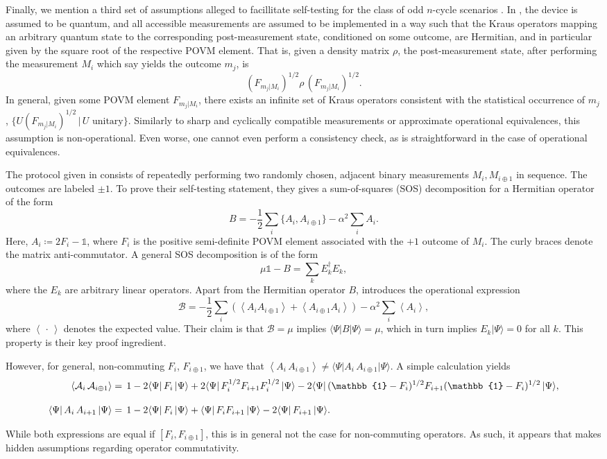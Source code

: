 Finally, we mention a third set of assumptions alleged to facillitate self-testing for the class of odd $n$-cycle scenarios \cite{Saha2020}. In \cite{Saha2020}, the device is assumed to be quantum, and all accessible measurements are assumed to be implemented in a way such that the Kraus operators mapping an arbitrary quantum state to the corresponding post-measurement state, conditioned on some outcome, are Hermitian, and in particular given by the square root of the respective POVM element. That is, given a density matrix $\rho$, the post-measurement state, after performing the measurement $M_i$ which say yields the outcome $m_j$, is 
\[(F_{m_j\vert M_i})^{1/2}\rho \,(F_{m_j\vert M_i})^{1/2}.\]
In general, given some POVM element $F_{m_j\vert M_i}$, there exists an infinite set of Kraus operators consistent with the statistical occurrence of $m_j$, $\{U(F_{m_j\vert M_i})^{1/2}\,\vert\, U \text{ unitary}\}$. Similarly to sharp and cyclically compatible measurements or approximate operational equivalences, this assumption is non-operational. Even worse, one cannot even perform a consistency check, as is straightforward in the case of operational equivalences.

The protocol given in \cite{Saha2020} consists of repeatedly performing two randomly chosen, adjacent binary measurements $M_i, M_{i\oplus 1}$ in sequence. The outcomes are labeled $\pm 1$.
To prove their self-testing statement, they gives a sum-of-squares (SOS) decomposition for a Hermitian operator of the form
\[B=-\frac{1}{2} \sum_i \{A_i, A_{i\oplus 1}\}-\alpha^2 \sum_i A_i.\] 
Here, $A_i \coloneqq 2F_i-\mathbb{1}$, where $F_i$ is the positive semi-definite POVM element associated with the $+1$ outcome of $M_i$. The curly braces denote the matrix anti-commutator.  A general SOS decomposition is of the form \[\mu\mathbb{1} - B = \sum_k E_k^{\dag}E_k,\]
where the $E_k$ are arbitrary linear operators. Apart from the Hermitian operator $B$, \cite{Saha2020} introduces the operational expression
\[\mathcal{B}=-\frac{1}{2}\sum_i \left(\left<A_i A_{i\oplus 1}\right> + \left<A_{i\oplus 1}A_i\right>\right)-\alpha^2\sum_i \left<A_i\right>,\]
where $\left<\,\cdot\,\right>$ denotes the expected value. Their claim is that $\mathcal{B}=\mu$ implies $\langle \Psi \vert B \vert \Psi \rangle = \mu$, which in turn implies $E_k\vert \Psi \rangle=0$ for all $k$. This property is their key proof ingredient.

However, for general, non-commuting $F_i$, $F_{i\oplus 1}$, we have that $\left<A_i \,A_{i\oplus 1}\right>\neq \langle \Psi \vert A_i\, A_{i\oplus 1}\vert \Psi \rangle$. A simple calculation yields
\[
\begin{split}
\langle \mathcal{A}_i \,\mathcal{A}_{i\oplus1}\rangle & =  \thinspace  1 - 2\langle \Psi \vert\, F_i\, \vert \Psi \rangle + 2 \langle \Psi \vert \,F_i^{1/2} F_{i+1} F_i^{1/2}\, \vert  \Psi \rangle - 2 \langle \Psi \vert \, (\mathbb{1}-F_i)^{1/2} F_{i+1} (\mathbb{1}-F_i)^{1/2} \, \vert \Psi \rangle,\\[1em]
\langle \Psi \vert\, A_i\, A_{i+1}\, \vert \Psi \rangle & =  \thinspace 1-2\langle \Psi \vert\, F_i \,\vert \Psi \rangle + \langle \Psi \vert \, F_i F_{i+1} \,\vert \Psi \rangle - 2 \langle \Psi \vert\, F_{i+1}\, \vert \Psi \rangle.
\end{split}
\]

While both expressions are equal if $\left[F_i, F_{i\oplus 1}\right]$, this is in general not the case for non-commuting operators. As such, it appears that \cite{Saha2020} makes hidden assumptions regarding operator commutativity.